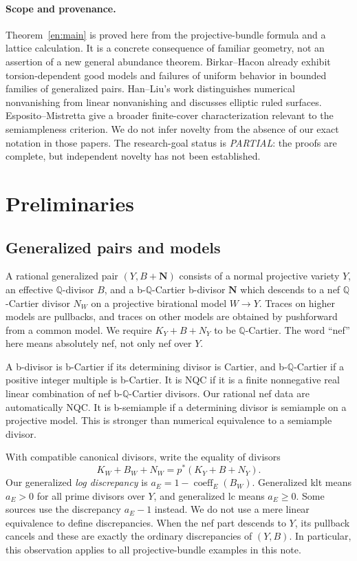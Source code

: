 \documentclass[12pt]{amsart}
\theoremstyle{definition}
\theoremstyle{remark}
\numberwithin{equation}{section}
\newcommand{\Q}{\mathbb{Q}}
\newcommand{\bN}{\mathbf N}
\begin{document}
\paragraph{Scope and provenance.}
Theorem~\ref{en:main} is proved here from the projective-bundle formula and a lattice calculation. It is a concrete consequence of familiar geometry, not an assertion of a new general abundance theorem. Birkar--Hacon \cite[Example 1.1, Example 3.1 and \S4]{en-BH} already exhibit torsion-dependent good models and failures of uniform behavior in bounded families of generalized pairs. Han--Liu's work \cite{en-HL} distinguishes numerical nonvanishing from linear nonvanishing and discusses elliptic ruled surfaces. Esposito--Mistretta \cite{en-EM} give a broader finite-cover characterization relevant to the semiampleness criterion. We do not infer novelty from the absence of our exact notation in those papers. The research-goal status is \emph{PARTIAL}: the proofs are complete, but independent novelty has not been established.

\section{Preliminaries}\label{en:prelim}
\subsection{Generalized pairs and models}
A rational generalized pair $(Y,B+\bN)$ consists of a normal projective variety $Y$, an effective $\Q$-divisor $B$, and a b-$\Q$-Cartier b-divisor $\bN$ which descends to a nef $\Q$-Cartier divisor $N_W$ on a projective birational model $W\to Y$. Traces on higher models are pullbacks, and traces on other models are obtained by pushforward from a common model. We require $K_Y+B+N_Y$ to be $\Q$-Cartier. The word ``nef'' here means absolutely nef, not only nef over $Y$.

A b-divisor is b-Cartier if its determining divisor is Cartier, and b-$\Q$-Cartier if a positive integer multiple is b-Cartier. It is NQC if it is a finite nonnegative real linear combination of nef b-$\Q$-Cartier divisors. Our rational nef data are automatically NQC. It is b-semiample if a determining divisor is semiample on a projective model. This is stronger than numerical equivalence to a semiample divisor.

With compatible canonical divisors, write the equality of divisors
\[
 K_W+B_W+N_W=p^*(K_Y+B+N_Y).
\]
Our generalized \emph{log discrepancy} is $a_E=1-\operatorname{coeff}_E(B_W)$. Generalized klt means $a_E>0$ for all prime divisors over $Y$, and generalized lc means $a_E\geq0$. Some sources use the discrepancy $a_E-1$ instead. We do not use a mere linear equivalence to define discrepancies. When the nef part descends to $Y$, its pullback cancels and these are exactly the ordinary discrepancies of $(Y,B)$. In particular, this observation applies to all projective-bundle examples in this note.
\end{document}
